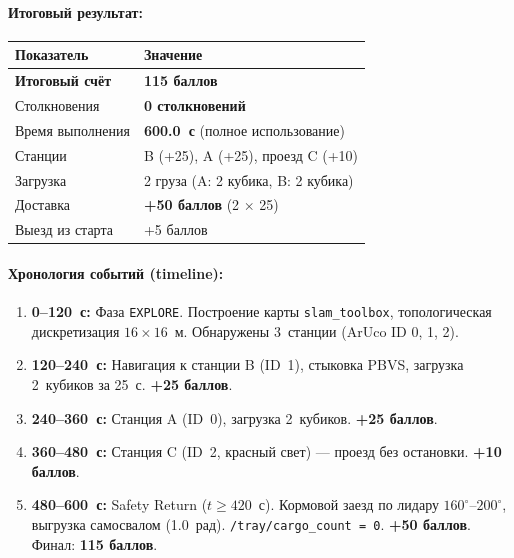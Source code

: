 \documentclass[a4paper,11pt]{article}
\begin{document}
\paragraph{Итоговый результат:}
\begin{center}
\begin{tabularx}{0.88\textwidth}{|l|X|}
\hline
\rowcolor{code_bg}
\textbf{Показатель} & \textbf{Значение} \\
\hline
\textbf{Итоговый счёт} & \textbf{115 баллов} \\
\hline
Столкновения & \textbf{0 столкновений} \\
\hline
Время выполнения & \textbf{600.0~с} (полное использование) \\
\hline
Станции & B (+25), A (+25), проезд C (+10) \\
\hline
Загрузка & 2 груза (A: 2 кубика, B: 2 кубика) \\
\hline
Доставка & \textbf{+50 баллов} (2 $\times$ 25) \\
\hline
Выезд из старта & +5 баллов \\
\hline
\end{tabularx}
\end{center}

\paragraph{Хронология событий (timeline):}
\begin{enumerate}[leftmargin=*,nosep]
    \item \textbf{0--120~с:} Фаза \texttt{EXPLORE}. Построение карты \texttt{slam\_toolbox}, топологическая дискретизация $16 \times 16$~м. Обнаружены 3~станции (ArUco ID 0, 1, 2).
    \item \textbf{120--240~с:} Навигация к станции B (ID~1), стыковка PBVS, загрузка 2~кубиков за 25~с. \textbf{+25 баллов}.
    \item \textbf{240--360~с:} Станция A (ID~0), загрузка 2~кубиков. \textbf{+25 баллов}.
    \item \textbf{360--480~с:} Станция C (ID~2, красный свет) --- проезд без остановки. \textbf{+10 баллов}.
    \item \textbf{480--600~с:} Safety Return ($t \ge 420$~с). Кормовой заезд по лидару $160^\circ$--$200^\circ$, выгрузка самосвалом (1.0~рад). \texttt{/tray/cargo\_count = 0}. \textbf{+50 баллов}. Финал: \textbf{115 баллов}.
\end{enumerate}
\end{document}
